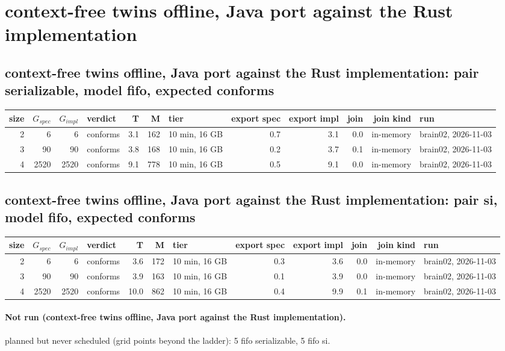 \documentclass[10pt]{article}
\begin{document}
\section*{context-free twins offline, Java port against the Rust implementation}
\subsection*{context-free twins offline, Java port against the Rust implementation: pair \textsf{serializable}, model fifo, expected conforms}
\begin{longtable}{@{}rrrlrrlrrrrl@{}}
\toprule
size & $G_{\mathit{spec}}$ & $G_{\mathit{impl}}$ & verdict & T & M & tier & export spec & export impl & join & join kind & run \\
\midrule
\endhead
\color{red} 2 & 6 & 6 & conforms & 3.1 & 162 & 10 min, 16 GB & 0.7 & 3.1 & 0.0 & in-memory & brain02, 2026-11-03 \\
\color{red} 3 & 90 & 90 & conforms & 3.8 & 168 & 10 min, 16 GB & 0.2 & 3.7 & 0.1 & in-memory & brain02, 2026-11-03 \\
\color{red} 4 & 2520 & 2520 & conforms & 9.1 & 778 & 10 min, 16 GB & 0.5 & 9.1 & 0.0 & in-memory & brain02, 2026-11-03 \\
\bottomrule
\end{longtable}
\subsection*{context-free twins offline, Java port against the Rust implementation: pair \textsf{si}, model fifo, expected conforms}
\begin{longtable}{@{}rrrlrrlrrrrl@{}}
\toprule
size & $G_{\mathit{spec}}$ & $G_{\mathit{impl}}$ & verdict & T & M & tier & export spec & export impl & join & join kind & run \\
\midrule
\endhead
\color{red} 2 & 6 & 6 & conforms & 3.6 & 172 & 10 min, 16 GB & 0.3 & 3.6 & 0.0 & in-memory & brain02, 2026-11-03 \\
\color{red} 3 & 90 & 90 & conforms & 3.9 & 163 & 10 min, 16 GB & 0.1 & 3.9 & 0.0 & in-memory & brain02, 2026-11-03 \\
\color{red} 4 & 2520 & 2520 & conforms & 10.0 & 862 & 10 min, 16 GB & 0.4 & 9.9 & 0.1 & in-memory & brain02, 2026-11-03 \\
\bottomrule
\end{longtable}
\paragraph{Not run (context-free twins offline, Java port against the Rust implementation).}
planned but never scheduled (grid points beyond the ladder): 5 fifo serializable, 5 fifo si.\par
\end{document}
